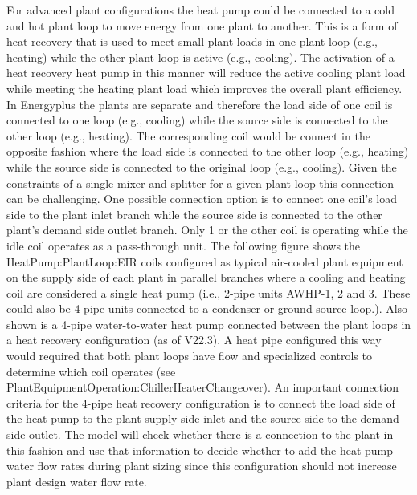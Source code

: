 For advanced plant configurations the heat pump could be connected to a cold and hot plant loop to move energy from one plant to another. This is a form of heat recovery that is used to meet small plant loads in one plant loop (e.g., heating) while the other plant loop is active (e.g., cooling). The activation of a heat recovery heat pump in this manner will reduce the active cooling plant load while meeting the heating plant load which improves the overall plant efficiency. In Energyplus the plants are separate and therefore the load side of one coil is connected to one loop (e.g., cooling) while the source side is connected to the other loop (e.g., heating). The corresponding coil would be connect in the opposite fashion where the load side is connected to the other loop (e.g., heating) while the source side is connected to the original loop (e.g., cooling). Given the constraints of a single mixer and splitter for a given plant loop this connection can be challenging. One possible connection option is to connect one coil's load side to the plant inlet branch while the source side is connected to the other plant's demand side outlet branch. Only 1 or the other coil is operating while the idle coil operates as a pass-through unit. The following figure shows the HeatPump:PlantLoop:EIR coils configured as typical air-cooled plant equipment on the supply side of each plant in parallel branches where a cooling and heating coil are considered a single heat pump (i.e., 2-pipe units AWHP-1, 2 and 3. These could also be 4-pipe units connected to a condenser or ground source loop.). Also shown is a 4-pipe water-to-water heat pump connected between the plant loops in a heat recovery configuration (as of V22.3). A heat pipe configured this way would required that both plant loops have flow and specialized controls to determine which coil operates (see PlantEquipmentOperation:ChillerHeaterChangeover). An important connection criteria for the 4-pipe heat recovery configuration is to connect the load side of the heat pump to the plant supply side inlet and the source side to the demand side outlet. The model will check whether there is a connection to the plant in this fashion and use that information to decide whether to add the heat pump water flow rates during plant sizing since this configuration should not increase plant design water flow rate.

